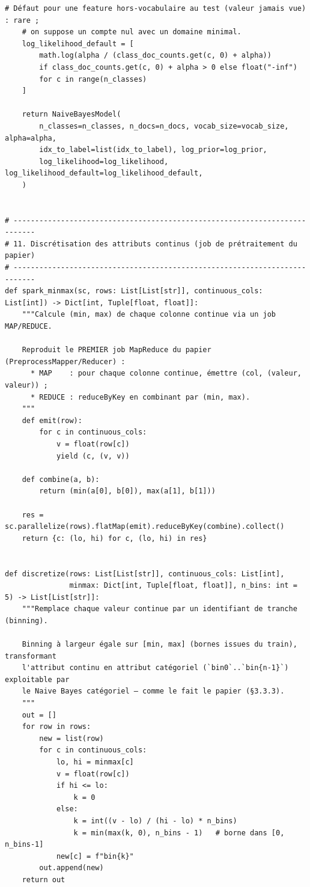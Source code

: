 \begin{lstlisting}[style=py]
    # Défaut pour une feature hors-vocabulaire au test (valeur jamais vue) : rare ;
    # on suppose un compte nul avec un domaine minimal.
    log_likelihood_default = [
        math.log(alpha / (class_doc_counts.get(c, 0) + alpha))
        if class_doc_counts.get(c, 0) + alpha > 0 else float("-inf")
        for c in range(n_classes)
    ]

    return NaiveBayesModel(
        n_classes=n_classes, n_docs=n_docs, vocab_size=vocab_size, alpha=alpha,
        idx_to_label=list(idx_to_label), log_prior=log_prior,
        log_likelihood=log_likelihood, log_likelihood_default=log_likelihood_default,
    )


# ---------------------------------------------------------------------------
# 11. Discrétisation des attributs continus (job de prétraitement du papier)
# ---------------------------------------------------------------------------
def spark_minmax(sc, rows: List[List[str]], continuous_cols: List[int]) -> Dict[int, Tuple[float, float]]:
    """Calcule (min, max) de chaque colonne continue via un job MAP/REDUCE.

    Reproduit le PREMIER job MapReduce du papier (PreprocessMapper/Reducer) :
      * MAP    : pour chaque colonne continue, émettre (col, (valeur, valeur)) ;
      * REDUCE : reduceByKey en combinant par (min, max).
    """
    def emit(row):
        for c in continuous_cols:
            v = float(row[c])
            yield (c, (v, v))

    def combine(a, b):
        return (min(a[0], b[0]), max(a[1], b[1]))

    res = sc.parallelize(rows).flatMap(emit).reduceByKey(combine).collect()
    return {c: (lo, hi) for c, (lo, hi) in res}


def discretize(rows: List[List[str]], continuous_cols: List[int],
               minmax: Dict[int, Tuple[float, float]], n_bins: int = 5) -> List[List[str]]:
    """Remplace chaque valeur continue par un identifiant de tranche (binning).

    Binning à largeur égale sur [min, max] (bornes issues du train), transformant
    l'attribut continu en attribut catégoriel (`bin0`..`bin{n-1}`) exploitable par
    le Naive Bayes catégoriel — comme le fait le papier (§3.3.3).
    """
    out = []
    for row in rows:
        new = list(row)
        for c in continuous_cols:
            lo, hi = minmax[c]
            v = float(row[c])
            if hi <= lo:
                k = 0
            else:
                k = int((v - lo) / (hi - lo) * n_bins)
                k = min(max(k, 0), n_bins - 1)   # borne dans [0, n_bins-1]
            new[c] = f"bin{k}"
        out.append(new)
    return out
\end{lstlisting}
